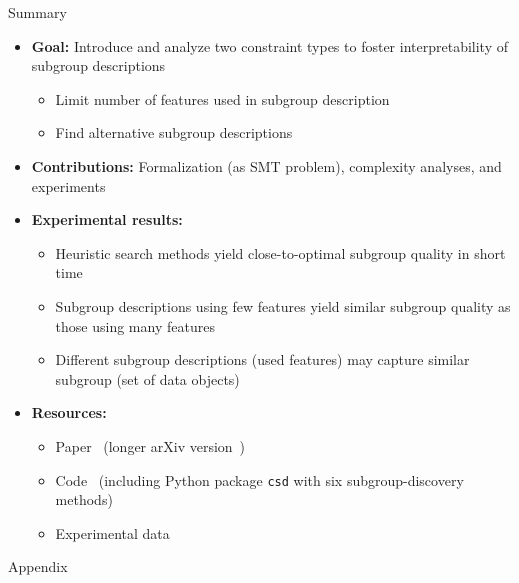 \documentclass[en, navbaroff, handout]{sdqbeamer}
\begin{document}
\begin{frame}[t]{Summary}
	\begin{itemize}
		\item \textbf{Goal:} Introduce and analyze two constraint types to foster interpretability of subgroup descriptions
		\begin{itemize}
			\item Limit number of features used in subgroup description
			\item Find alternative subgroup descriptions
		\end{itemize}
		\pause
		\vspace{\baselineskip}
		\item \textbf{Contributions:} Formalization (as SMT problem), complexity analyses, and experiments
		\pause
		\vspace{\baselineskip}
		\item \textbf{Experimental results:}
		\begin{itemize}
			\item Heuristic search methods yield close-to-optimal subgroup quality in short time
			\item Subgroup descriptions using few features yield similar subgroup quality as those using many features
			\item Different subgroup descriptions (used features) may capture similar subgroup (set of data objects)
		\end{itemize}
		\pause
		\vspace{\baselineskip}
		\item \textbf{Resources:}
		\begin{itemize}
			\item Paper~\cite{bach2025subgroup} (longer arXiv version~\cite{bach2025using})
			\item Code~\cite{bach2025constrained} (including Python package \texttt{csd} with six subgroup-discovery methods)
			\item Experimental data~\cite{bach2025experimental}
		\end{itemize}
	\end{itemize}
\end{frame}

\appendix
\beginbackup %

\begin{frame}[plain]
	\centering
	\Huge Appendix
\end{frame}
\end{document}
